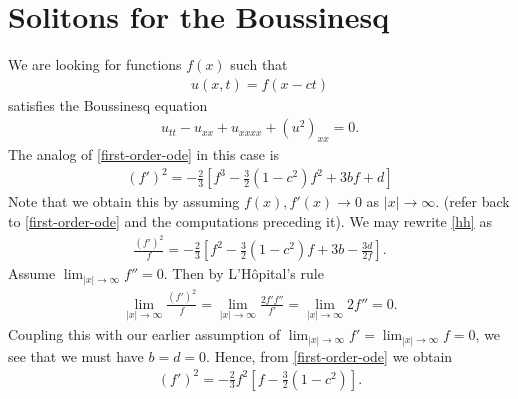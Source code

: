 \documentclass[12pt,reqno]{amsart}
\numberwithin{equation}{section}  %
\begin{document}
\section{Solitons for the Boussinesq} 
\label{sec:soliton}
We are looking for functions $f(x)$ such that
%
%
\begin{equation}
  \label{ansatz-bous}
\begin{split}
u(x,t) = f(x-ct)
\end{split}
\end{equation}
%
%
satisfies the Boussinesq equation
%
%
\begin{equation}
  \label{bous-eqn*}
\begin{split}
  u_{tt} -u_{xx} + u_{xxxx} + (u^{2})_{xx} = 0.
\end{split}
\end{equation}
%
%
The analog of \eqref{first-order-ode} in this case is
%
%
\begin{equation}
  \label{hh}
\begin{split}
  (f')^{2} = -\frac{2}{3} \left [ f^{3} - \frac{3}{2}(1-c^{2})f^{2} + 3bf +d \right ]
\end{split}
\end{equation}
%
Note that we obtain this by assuming $f(x), f'(x) \to 0$ as $|x| \to \infty$.
(refer back to \eqref{first-order-ode} and the computations preceding it).
We may rewrite \eqref{hh} as
%
%
\begin{equation}
  \label{first-order-rewritten}
\begin{split}
  \frac{(f')^{2}}{f} = -\frac{2}{3}\left[ f^{2} - \frac{3}{2}(1-c^{2})f+ 3b -
  \frac{3d}{2f}\right].
\end{split}
\end{equation}
%
%
Assume $\lim_{|x| \to \infty} f'' =0$. Then by L'H\^opital's rule
%
%
\begin{equation*}
\begin{split}
  \lim_{|x| \to \infty} \frac{(f')^{2}}{f} = \lim_{|x| \to \infty} \frac{2f'
  f''}{f'} = \lim_{|x| \to \infty} 2f'' = 0.
\end{split}
\end{equation*}
%
%
Coupling this with our earlier assumption of $\lim_{| x | \to \infty} f' = \lim_{| x
| \to \infty} f = 0$, we see that we must have $b =d=0$. Hence, from 
\eqref{first-order-ode} we obtain 
%
%
\begin{equation}
  \label{bous-ode-simp}
\begin{split}
  (f')^{2} = -\frac{2}{3} f^{2} \left[ f - \frac{3}{2}(1-c^{2})  \right].
\end{split}
\end{equation}
\end{document}
